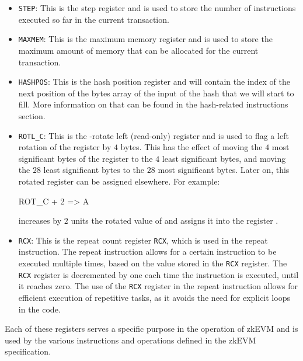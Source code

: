 \begin{itemize}
    \item \texttt{STEP}: This is the step register and is used to store the number of instructions executed so far in the current transaction.
    
    \item \texttt{MAXMEM}: This is the maximum memory register and is used to store the maximum amount of memory that can be allocated for the current transaction.
    
    \item \texttt{HASHPOS}: This is the hash position register and will contain the index of the next position of the bytes array of the input of the hash that we will start to fill. More information on that can be found in the hash-related instructions section. 
    
    \item \texttt{ROTL\_C}: This is the \C-rotate left (read-only) register and is used to flag a left rotation of the \C register by $4$ bytes. This has the effect of moving the $4$ most significant bytes of the \C register to the $4$ least significant bytes, and moving the $28$ least significant bytes to the $28$ most significant bytes. Later on, this rotated \C register can be assigned elsewhere. For example:
    
    \begin{zkasm}
        ROT_C + 2 => A
    \end{zkasm}
    increases by $2$ units the rotated value of \C and assigns it into the register \A.
    
    \item \texttt{RCX}: This is the repeat count register \texttt{RCX}, which is used in the repeat instruction. The repeat instruction allows for a certain instruction to be executed multiple times, based on the value stored in the \texttt{RCX} register. The \texttt{RCX} register is decremented by one each time the instruction is executed, until it reaches zero. The use of the \texttt{RCX} register in the repeat instruction allows for efficient execution of repetitive tasks, as it avoids the need for explicit loops in the code.
    
\end{itemize}

Each of these registers serves a specific purpose in the operation of zkEVM and is used by the various instructions and operations defined in the zkEVM specification.









